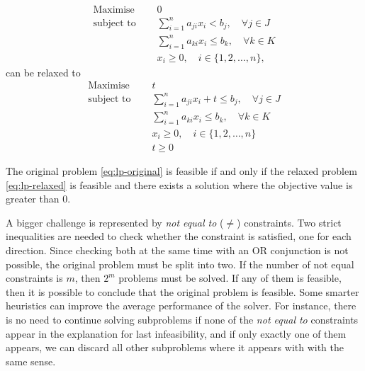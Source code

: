 \documentclass[runningheads]{llncs}
\begin{document}
\begin{equation}
    \label{eq:lp-original}
    \begin{split}
        \text{Maximise }   \quad & 0                                                          \\
        \text{subject to } \quad & \sum_{i=1}^{n} a_{ji}x_{i} < b_j,   \quad \forall j \in J  \\
        \quad                    & \sum_{i=1}^{n} a_{ki}x_{i} \le b_k,  \quad \forall k \in K \\
        & x_i \ge 0,  \quad i \in \{1, 2, \ldots, n\},
    \end{split}
\end{equation}
can be relaxed to
\begin{equation}
    \label{eq:lp-relaxed}
    \begin{split}
        \text{Maximise }   \quad & t                                                             \\
        \text{subject to } \quad & \sum_{i=1}^{n} a_{ji}x_{i} + t \le b_j, \quad \forall j \in J \\
        \quad                    & \sum_{i=1}^{n} a_{ki}x_{i} \le b_k, \quad \forall k \in K     \\
        & x_i \ge 0 , \quad i \in \{1, 2, \ldots, n\}                   \\
        & t \ge 0
    \end{split}
\end{equation}

\begin{theorem}
    \label{thm:lp-relaxed}
    The original problem \eqref{eq:lp-original} is feasible if and only if the relaxed problem \eqref{eq:lp-relaxed} is feasible and there exists a solution where the objective value is greater than $0$.
\end{theorem}

A bigger challenge is represented by \textit{not equal to} ($\ne$) constraints.
Two strict inequalities are needed to check whether the constraint is satisfied, one for each direction.
Since checking both at the same time with an OR conjunction is not possible, the original problem must be split into two.
If the number of not equal constraints is $m$, then $2^m$ problems must be solved.
If any of them is feasible, then it is possible to conclude that the original problem is feasible.
Some smarter heuristics can improve the average performance of the solver.
For instance, there is no need to continue solving subproblems if none of the \textit{not equal to} constraints appear in the explanation for last infeasibility, and if only exactly one of them appears, we can discard all other subproblems where it appears with with the same sense.
\end{document}
